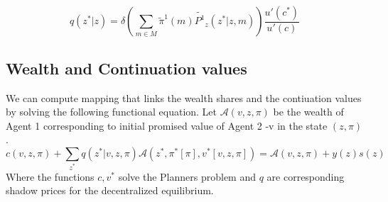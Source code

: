 \documentclass[12pt]{article}
\begin{document}
\[q(z^* |z )=\delta \left(\sum_{m \in M}\tilde{\pi}^1(m)\tilde{P^1}_z(z^* |z,m)\right)\frac{ u'(c^*)}{u'(c)}\]

\subsection{Wealth and Continuation values}
We can compute mapping that links the wealth shares and the contiuation values by solving the following functional equation. Let $\mathcal{A}(v,z,\pi)$ be the wealth of Agent 1 corresponding to initial promised value of Agent 2 -v in the state $(z,\pi)$. 
\begin{equation}
c(v,z,\pi) +\sum_{z^*} {q(z^*|v,z,\pi) \mathcal{A}(z^*,\pi^*[\pi],v^*[v,z,\pi])}=\mathcal{A}(v,z,\pi)+y(z)s(z)
\end{equation}
Where the functions $c,v^*$ solve the Planners problem and $q$ are corresponding shadow prices for the decentralized equilibrium.
\end{document}
